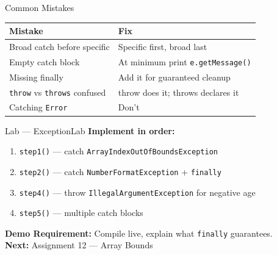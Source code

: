 \documentclass{beamer}
\begin{document}
\begin{frame}{Common Mistakes}
\begin{tabular}{ll}
\toprule
\textbf{Mistake} & \textbf{Fix} \\
\midrule
Broad catch before specific & Specific first, broad last \\
Empty catch block & At minimum print \texttt{e.getMessage()} \\
Missing finally & Add it for guaranteed cleanup \\
\texttt{throw} vs \texttt{throws} confused & throw does it; throws declares it \\
Catching \texttt{Error} & Don't \\
\bottomrule
\end{tabular}
\end{frame}
\begin{frame}{Lab --- ExceptionLab}
\textbf{Implement in order:}
\begin{enumerate}
  \item \texttt{step1()} --- catch \texttt{ArrayIndexOutOfBoundsException}
  \item \texttt{step2()} --- catch \texttt{NumberFormatException} + \texttt{finally}
  \item \texttt{step4()} --- throw \texttt{IllegalArgumentException} for negative age
  \item \texttt{step5()} --- multiple catch blocks
\end{enumerate}
\vspace{0.3cm}
\textbf{Demo Requirement:} Compile live, explain what \texttt{finally} guarantees.\\
\vspace{0.3cm}
\textbf{Next:} Assignment 12 --- Array Bounds
\end{frame}
\end{document}

